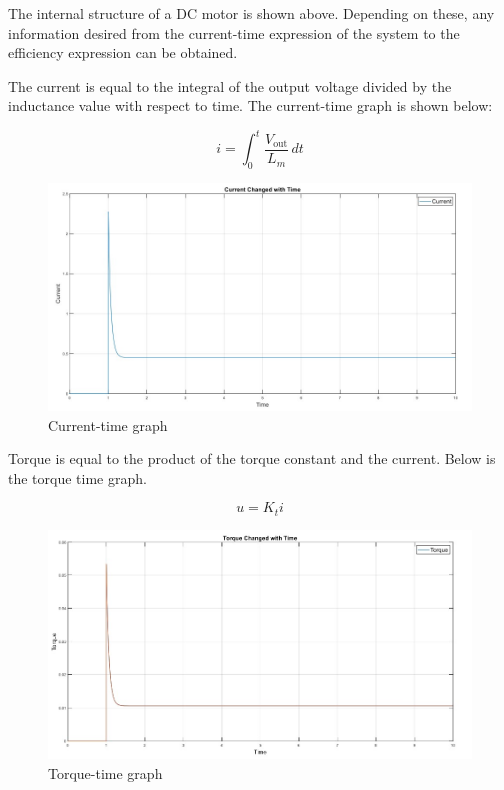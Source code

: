 The internal structure of a DC motor is shown above. Depending on these, any information desired from the current-time expression of the system to the efficiency expression can be obtained.

The current is equal to the integral of the output voltage divided by the inductance value with
respect to time. The current-time graph is shown below:


\begin{equation}
i = \int_{0}^{t} \frac{V_{\text{out}}}{L_m} \, dt 
\end{equation}



\begin{figure}[H]
    \centering
    \includegraphics[width=0.7\columnwidth]{imgs/io/a.jpg}
    \caption[Current-time graph]{Current-time graph}
    \label{fig-magnitude}
\end{figure}%

Torque is equal to the product of the torque constant and the current. Below is the torque time
graph.

\begin{equation}
u = K_t i
\end{equation}

\begin{figure}[H]
    \centering
    \includegraphics[width=0.7\columnwidth]{imgs/io/b.jpg}
    \caption[Torque-time graph]{Torque-time graph}
    \label{fig-magnitude}
\end{figure}%

